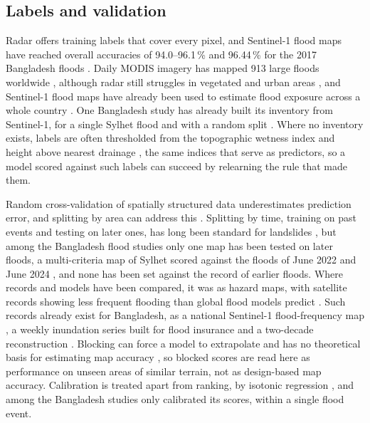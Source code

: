 \documentclass[10pt,a4paper,twocolumn]{article}
\begin{document}
\subsection{Labels and validation}

Radar offers training labels that cover every pixel, and Sentinel-1 flood maps have reached overall accuracies of 94.0--96.1\,\% \citep{twele2016} and 96.44\,\% for the 2017 Bangladesh floods \citep{uddin2019}. Daily MODIS imagery has mapped 913 large floods worldwide \citep{tellman2021}, although radar still struggles in vegetated and urban areas \citep{amitrano2024}, and Sentinel-1 flood maps have already been used to estimate flood exposure across a whole country \citep{sherpa2022}. One Bangladesh study has already built its inventory from Sentinel-1, for a single Sylhet flood and with a random split \citep{islamr2024}. Where no inventory exists, labels are often thresholded from the topographic wetness index \citep{beven1979} and height above nearest drainage \citep{nobre2011}, the same indices that serve as predictors, so a model scored against such labels can succeed by relearning the rule that made them.

Random cross-validation of spatially structured data underestimates prediction error, and splitting by area can address this \citep{roberts2017}. Splitting by time, training on past events and testing on later ones, has long been standard for landslides \citep{chung2003, guzzetti2006}, but among the Bangladesh flood studies only one map has been tested on later floods, a multi-criteria map of Sylhet scored against the floods of June 2022 and June 2024 \citep{swarup2026}, and none has been set against the record of earlier floods. Where records and models have been compared, it was as hazard maps, with satellite records showing less frequent flooding than global flood models predict \citep{hawker2020}. Such records already exist for Bangladesh, as a national Sentinel-1 flood-frequency map \citep{haghighi2022}, a weekly inundation series built for flood insurance \citep{thomas2023} and a two-decade reconstruction \citep{giezendanner2023}. Blocking can force a model to extrapolate \citep{roberts2017} and has no theoretical basis for estimating map accuracy \citep{wadoux2021}, so blocked scores are read here as performance on unseen areas of similar terrain, not as design-based map accuracy. Calibration is treated apart from ranking, by isotonic regression \citep{zadrozny2002, niculescu2005}, and among the Bangladesh studies only \citet{diptho2026} calibrated its scores, within a single flood event.
\end{document}
